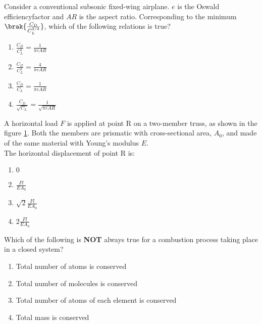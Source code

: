 \iffalse
\chapter{2022}
\author{AI24BTECH11015 - Harshvardhan Patidar}
\section{ae}
\fi
    \item Consider a conventional subsonic fixed-wing airplane. $e$ is the Oswald efficiencyfactor and $AR$ is the aspect ratio. Corresponding to the minimum $\brak{\frac{C_D}{C_L^{3/2}}}$, which of the following relations is true?
    \begin{enumerate}
        \item $\frac{C_D}{C_L^2} = \frac{1}{\pi e A R}$
        \item $\frac{C_D}{C_L^2} = \frac{4}{\pi e A R}$
        \item $\frac{C_D}{C_L} = \frac{1}{\pi e A R}$
        \item $\frac{C_D}{\sqrt{C_L}} = \frac{1}{\sqrt{\pi e A R}}$
    \end{enumerate}


    \item A horizontal load $F$ is applied at point R on a two-member truss, as shown in the figure \ref{41fig}. Both the members are prismatic with cross-sectional area, $A_0$, and made of the same material with Young's modulus $E$.\\The horizontal displacement of point R is:
        \begin{figure}[H]
            \centering
            
            \caption{}
            \label{41fig}
        \end{figure}

        \begin{enumerate}
            \item $0$
            \item $\frac{Fl}{E A_0}$
            \item $\sqrt{2}\frac{Fl}{E A_0}$
            \item $2\frac{Fl}{E A_0}$
        \end{enumerate}

    \item Which of the following is \textbf{NOT} always true for a combustion process taking place in a closed system?
        \begin{enumerate}
            \item Total number of atoms is conserved
            \item Total number of molecules is conserved
            \item Total number of atoms of each element is conserved
            \item Total mass is conserved
        \end{enumerate}


